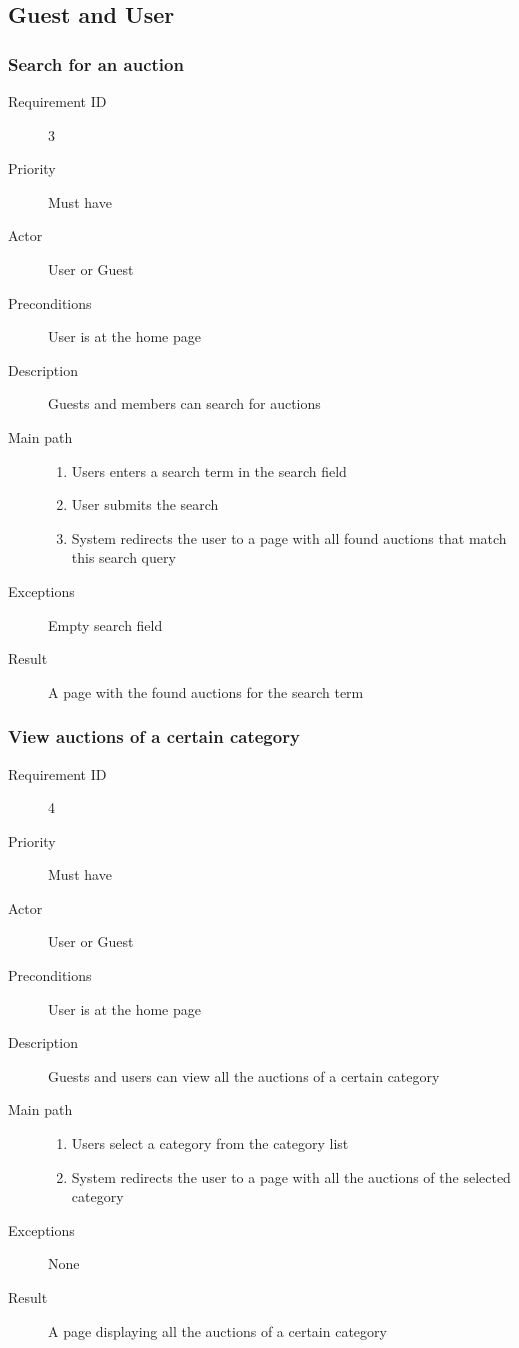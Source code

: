 	\subsection{Guest and User}
		\subsubsection{Search for an auction}
			\begin{description}
				\item[Requirement ID] 3
				\item[Priority] Must have
				\item[Actor] User or Guest
				\item[Preconditions] User is at the home page
				\item[Description] Guests and members can search for auctions
				\item[Main path]
 					\begin{enumerate}
						\item Users enters a search term in the search field
						\item User submits the search
						\item System redirects the user to a page with all found auctions that match this search
						query
					\end{enumerate}
				\item[Exceptions] Empty search field
				\item[Result] A page with the found auctions for the search term
			\end{description}
		\subsubsection{View auctions of a certain category}
			\begin{description}
				\item[Requirement ID] 4
				\item[Priority] Must have
				\item[Actor] User or Guest
				\item[Preconditions] User is at the home page
				\item[Description] Guests and users can view all the auctions of a certain category
				\item[Main path]
 					\begin{enumerate}
						\item Users select a category from the category list
						\item System redirects the user to a page with all the auctions of the
							selected category
					\end{enumerate}
				\item[Exceptions] None
				\item[Result] A page displaying all the auctions of a certain category
			\end{description}
